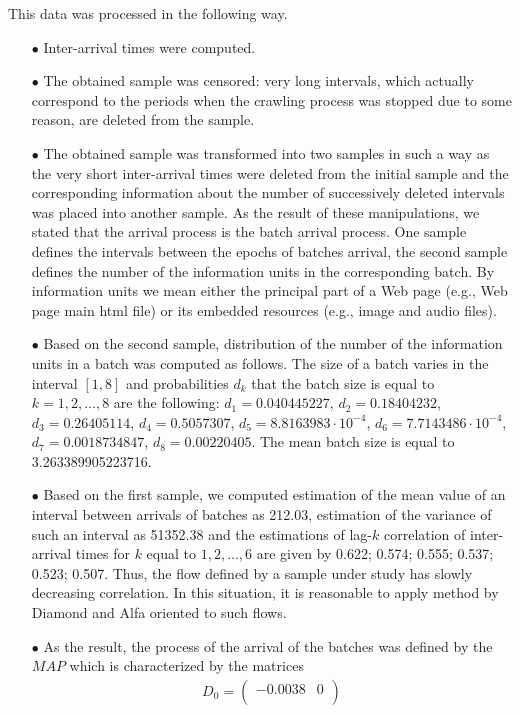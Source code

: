 \documentclass[11pt]{article}
\begin{document}
This data was
processed in the following way.
\begin{itemize}
\item[$\bullet$]
Inter-arrival times were computed.
\item[$\bullet$]
The obtained sample was censored: very long intervals, which
actually correspond to the periods when the crawling process was
stopped due to some reason, are deleted from the sample.
\item[$\bullet$]
The obtained sample was transformed into two samples in such a way
as the very short inter-arrival times were deleted from the initial
sample and the corresponding information about the number of
successively deleted intervals was placed into another sample. As
the result of these manipulations, we stated that the arrival
process is the batch arrival process. One sample defines the
intervals between the epochs of batches arrival, the second sample
defines the number of the information units in the corresponding
batch. By information units we mean either the principal part of
a Web page (e.g., Web page main html file) or its embedded resources
(e.g., image and audio files).
\item[$\bullet$]
Based on the second sample, distribution of the number of the
information units in a batch was computed as follows. The size of a
batch varies in the interval $[1,8]$ and probabilities $d_k$ that
the batch size is equal to $k=1,2,\dots,8$ are the following:
$d_1=0.040445227$, $d_2=0.18404232$, $d_3=0.26405114$,
$d_4=0.5057307$, $d_5=8.8163983\cdot 10^{-4}$, $d_6=7.7143486\cdot
10^{-4}$, $d_7=0.0018734847$, $d_8=0.00220405$. The mean batch size
is equal to
 3.263389905223716.
 \item[$\bullet$]
 Based on the first sample, we computed estimation of the mean value of an interval between
 arrivals of batches as 212.03,
estimation of the variance of such an interval as 51352.38 and the
estimations of lag-$k$ correlation of inter-arrival times for $k$
equal to $1,2,\dots,6$ are given by  0.622;  0.574; 0.555; 0.537;
0.523; 0.507. Thus, the flow defined by a sample under study has
slowly decreasing correlation. In this situation, it is reasonable
to apply method by Diamond and Alfa \cite{da} oriented to such flows.
 \item[$\bullet$]
 As the result, the process of the arrival of the batches was
 defined by the $MAP$ which is characterized by the matrices
 \begin{gather*}
D_0=\begin{pmatrix}
  -0.0038 & 0 \\

\end{pmatrix}
\end{gather*}
\end{itemize}
\end{document}
